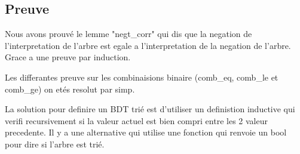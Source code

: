 \documentclass{article}
\begin{document}
\subsection{Preuve}

Nous avons prouvé le lemme "negt\_corr" qui dis que la negation de
l'interpretation de l'arbre est egale a l'interpretation de la negation de
l'arbre. Grace a une preuve par induction.

Les differantes preuve sur les combinaisions binaire (comb\_eq, comb\_le et
comb\_ge) on etés resolut par simp.

La solution pour definire un BDT trié est d'utiliser un definistion
inductive qui verifi recursivement si la valeur actuel est bien compri
entre les 2 valeur precedente.
Il y a une alternative qui utilise une fonction qui renvoie un bool pour
dire si l'arbre est trié.
\end{document}
